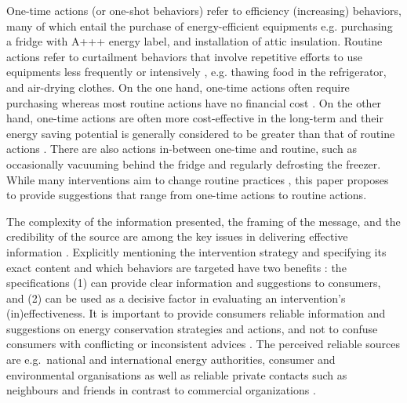 \documentclass[a4paper,10pt]{article}
\begin{document}
One-time actions (or one-shot behaviors) refer to efficiency (increasing) behaviors, many of which entail the purchase of energy-efficient equipments \citep{Abrahamse2005,Gardner2008} 
e.g. purchasing a fridge with A+++ energy label, and installation of attic insulation. Routine actions refer to curtailment behaviors that involve repetitive efforts to use equipments less frequently or intensively \citep{Abrahamse2005,Gardner2008}, e.g. thawing food in the refrigerator, and air-drying clothes. On the one hand, one-time actions often require purchasing %
whereas most routine actions have no financial cost \citep{Abrahamse2005,Gardner2008}. On the other hand, one-time actions are often more cost-effective in the long-term \citep{Froehlich2009} and their energy saving potential is generally considered to be greater than that of routine actions \citep{Abrahamse2005,Gardner2008}. There are also actions in-between one-time and routine, such as occasionally vacuuming behind the fridge and regularly defrosting the freezer. While many interventions aim to change routine practices \citep{Froehlich2009}, this paper proposes to provide suggestions that range from one-time actions to routine actions. 

The complexity of the information presented, the framing of the message, and the credibility of the source are among the key issues in delivering effective information \citep{Schultz2002}. Explicitly mentioning the intervention strategy and specifying its exact content and which behaviors are targeted have two benefits \citep{Abrahamse2005}: the specifications (1) can provide clear information and suggestions to consumers, and (2) can be used as a decisive factor in evaluating an intervention's (in)effectiveness. It is important to provide consumers reliable information and suggestions on energy conservation strategies and actions, and not to confuse consumers with conflicting or inconsistent advices \citep{CEER2015}. The perceived reliable sources are e.g.~national and international energy authorities, consumer and environmental organisations \citep{CEER2015} as well as reliable private contacts such as neighbours and friends in contrast to commercial organizations \citep{Selvefors2015}.
\end{document}
